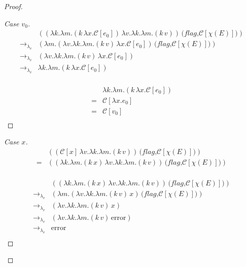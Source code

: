 \documentclass[ms,electronic,twosidetoc,letterpaper,chaptercenter,parttop]{byumsphd}
\begin{document}
\begin{proof}
\begin{proof}[Case $v_0$]
\begin{align*}
                        &((\lambda k.\lambda m.(k\,\lambda x.\mathcal{C}[e_0])\,\lambda v.\lambda k.\lambda m.(k\,v))\,\textbf{(}\textit{flag}\textbf{,}\mathcal{C}[\chi(E)]\textbf{)})\\
\rightarrow_{\lambda_v} &(\lambda m.(\lambda v.\lambda k.\lambda m.(k\,v)\,\lambda x.\mathcal{C}[e_0])\,\textbf{(}\textit{flag}\textbf{,}\mathcal{C}[\chi(E)]\textbf{)})\\
\rightarrow_{\lambda_v} &(\lambda v.\lambda k.\lambda m.(k\,v)\,\lambda x.\mathcal{C}[e_0])\\
\rightarrow_{\lambda_v} &\lambda k.\lambda m.(k\,\lambda x.\mathcal{C}[e_0])\\
\end{align*}

\begin{align*}
  &\lambda k.\lambda m.(k\,\lambda x.\mathcal{C}[e_0])\\
= &\mathcal{C}[\lambda x.e_0]\\
= &\mathcal{C}[v_0]\\
\end{align*}
\end{proof}

\begin{proof}[Case $x$]
\begin{align*}
  &((\mathcal{C}[x]\,\lambda v.\lambda k.\lambda m.(k\,v))\,\textbf{(}\textit{flag}\textbf{,}\mathcal{C}[\chi(E)]\textbf{)})\\
= &((\lambda k.\lambda m.(k\,x)\,\lambda v.\lambda k.\lambda m.(k\,v))\,\textbf{(}\textit{flag}\textbf{,}\mathcal{C}[\chi(E)]\textbf{)})\\
\end{align*}

\begin{align*}
                        &((\lambda k.\lambda m.(k\,x)\,\lambda v.\lambda k.\lambda m.(k\,v))\,\textbf{(}\textit{flag}\textbf{,}\mathcal{C}[\chi(E)]\textbf{)})\\
\rightarrow_{\lambda_v} &(\lambda m.(\lambda v.\lambda k.\lambda m.(k\,v)\,x)\,\textbf{(}\textit{flag}\textbf{,}\mathcal{C}[\chi(E)]\textbf{)})\\
\rightarrow_{\lambda_v} &(\lambda v.\lambda k.\lambda m.(k\,v)\,x)\\
\rightarrow_{\lambda_v} &(\lambda v.\lambda k.\lambda m.(k\,v)\,\mathrm{error})\\
\rightarrow_{\lambda_v} &\mathrm{error}\\
\end{align*}
\end{proof}

\end{proof}
\end{document}
